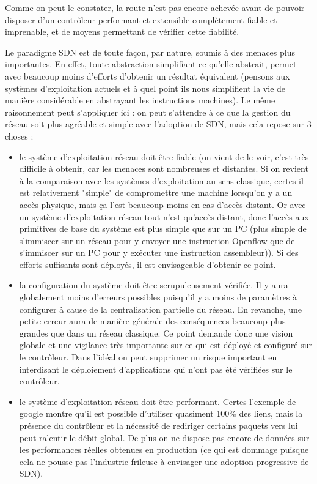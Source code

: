 Comme on peut le constater, la route n'est pas encore achevée avant de pouvoir disposer d'un contrôleur performant et extensible complètement fiable et imprenable, et de moyens permettant de vérifier cette fiabilité.

Le paradigme SDN est de toute façon, par nature, soumis à des menaces plus importantes. En effet, toute abstraction simplifiant ce qu'elle abstrait, permet avec beaucoup moins d'efforts d'obtenir un résultat équivalent (pensons aux systèmes d'exploitation actuels et à quel point ils nous simplifient la vie de manière considérable en abstrayant les instructions machines). Le même raisonnement peut s'appliquer ici : on peut s'attendre à ce que la gestion du réseau soit plus agréable et simple avec l'adoption de SDN, mais cela repose sur 3 choses :

\begin{itemize}

\item le système d'exploitation réseau doit être fiable (on vient de le voir, c'est très difficile à obtenir, car les menaces sont nombreuses et distantes. Si on revient à la comparaison avec les systèmes d'exploitation au sens classique, certes il est relativement "simple" de compromettre une machine lorsqu'on y a un accès physique, mais ça l'est beaucoup moins en cas d'accès distant. Or avec un système d'exploitation réseau tout n'est qu'accès distant, donc l'accès aux primitives de base du système est plus simple que sur un PC (plus simple de s'immiscer sur un réseau pour y envoyer une instruction Openflow que de s'immiscer sur un PC pour y exécuter une instruction assembleur)). Si des efforts suffisants sont déployés, il est envisageable d'obtenir ce point.
\item la configuration du système doit être scrupuleusement vérifiée. Il y aura globalement moins d'erreurs possibles puisqu'il y a moins de paramètres à configurer à cause de la centralisation partielle du réseau. En revanche, une petite erreur aura de manière générale des conséquences beaucoup plus grandes que dans un réseau classique. Ce point demande donc une vision globale et une vigilance très importante sur ce qui est déployé et configuré sur le contrôleur. Dans l'idéal on peut supprimer un risque important en interdisant le déploiement d'applications qui n'ont pas été vérifiées sur le contrôleur.
\item le système d'exploitation réseau doit être performant. Certes l'exemple de google montre qu'il est possible d'utiliser quasiment 100\% des liens, mais la présence du contrôleur et la nécessité de rediriger certains paquets vers lui peut ralentir le débit global. De plus on ne dispose pas encore de données sur les performances réelles obtenues en production (ce qui est dommage puisque cela ne pousse pas l'industrie frileuse à envisager une adoption progressive de SDN).

\end{itemize}

